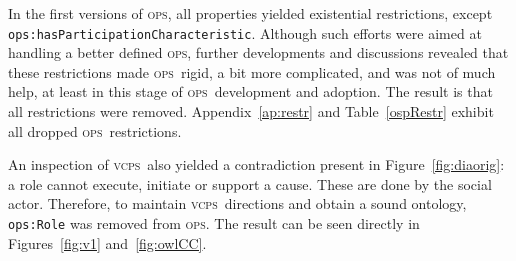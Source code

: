 \documentclass[10pt,letterpaper]{article}
\newcommand{\ops}{\textsc{ops}}
\newcommand{\vcps}{\textsc{vcps}}
\begin{document}
In the first versions of \ops, all properties yielded existential restrictions, except {\tt ops:hasParticipationCharacteristic}. Although such efforts were aimed at handling a better defined \ops, further developments and discussions revealed that these restrictions made \ops\ rigid, a bit more complicated, and was not of much help, at least in this stage of \ops\ development and adoption. The result is that all restrictions were removed. Appendix~\ref{ap:restr} and Table~\ref{ospRestr} exhibit all dropped \ops\ restrictions.

An inspection of \vcps\ also yielded a contradiction present in Figure~\ref{fig:diaorig}: a role cannot execute, initiate or support a cause. These are done by the social actor. Therefore, to maintain \vcps\ directions and obtain a sound ontology, {\tt ops:Role} was removed from \ops. The result can be seen directly in Figures~\ref{fig:v1} and~\ref{fig:owlCC}.
\end{document}
